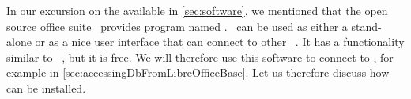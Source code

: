%
%
\label{sec:installLibreOffice}%
%
In our excursion on the available  in \cref{sec:software}, we mentioned that the open source office suite \libreoffice\ provides program named \libreofficeBase.
\libreofficeBase\ can be used as either a stand-alone  or as a nice user interface that can connect to other ~\cite{FNFHWSKLSSGLFRSRPLJG2022BG7R1BOL7C,S2022L7PFEUU}.
It has a functionality similar to \microsoftAccess~\cite{SSI2023MA2BTA,B2020HOMA2,UC2021AFD}, but it is free.
We will therefore use this software to connect to \postgresql, for example in \cref{sec:accessingDbFromLibreOfficeBase}.
Let us therefore discuss how \libreoffice~\cite{DF2024LTDF,GL2012LTSOOSSCBAFACSOL,S2022L7PFEUU} can be installed.%
%
%
%
%
\endhsection%
%
